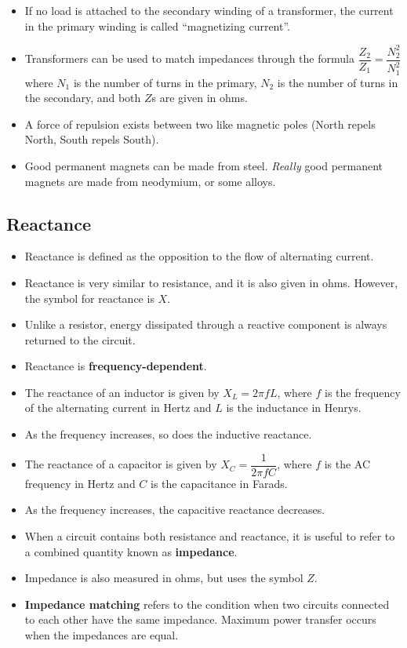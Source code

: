 \documentclass[letterpaper,12pt]{scrartcl}
\begin{document}
\begin{itemize}
\item If no load is attached to the secondary winding of a transformer, the current in the primary winding is called ``magnetizing current''.
\item Transformers can be used to match impedances through the formula $\dfrac{Z_2}{Z_1} = \dfrac{N_{2}^2}{N_{1}^2}$
where $N_1$ is the number of turns in the primary, $N_2$ is the number of turns in the secondary, and both $Z$s are given in ohms.
\item A force of repulsion exists between two like magnetic poles (North repels North, South repels South).
\item Good permanent magnets can be made from steel. \textit{Really} good permanent magnets are made from neodymium, or some alloys.
\end{itemize}

\subsection{Reactance}

\begin{itemize}
\item Reactance is defined as the opposition to the flow of alternating current.
\item Reactance is very similar to resistance, and it is also given in ohms. However, the symbol for reactance is $X$.
\item Unlike a resistor, energy dissipated through a reactive component is always returned to the circuit.
\item Reactance is \textbf{frequency-dependent}.
\item The reactance of an inductor is given by $X_L = 2 \pi f L$, where $f$ is the frequency of the alternating current in Hertz
and $L$ is the inductance in Henrys.
\item As the frequency increases, so does the inductive reactance.
\item The reactance of a capacitor is given by $X_C = \dfrac{1}{2 \pi f C}$, where $f$ is the AC frequency in Hertz and $C$ is the capacitance in Farads.
\item As the frequency increases, the capacitive reactance decreases.
\item When a circuit contains both resistance and reactance, it is useful to refer to a combined quantity known as \textbf{impedance}.
\item Impedance is also measured in ohms, but uses the symbol $Z$.
\item \textbf{Impedance matching} refers to the condition when two circuits connected to each other have the same impedance.
Maximum power transfer occurs when the impedances are equal.
\end{itemize}
\end{document}
